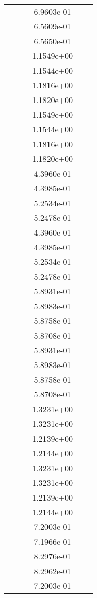 \begin{xltabular}{\textwidth}{r|rS[table-format=1.3e+2]S[table-format=1.4e+2]S[table-format=1.4e+2]S[table-format=-1.5]}
&  &  & 6.9603e-01 & & \\
&  &  & 6.5609e-01 & & \\
&  &  & 6.5650e-01 & & \\
&  &  & 1.1549e+00 & & \\
&  &  & 1.1544e+00 & & \\
&  &  & 1.1816e+00 & & \\
&  &  & 1.1820e+00 & & \\
&  &  & 1.1549e+00 & & \\
&  &  & 1.1544e+00 & & \\
&  &  & 1.1816e+00 & & \\
&  &  & 1.1820e+00 & & \\
&  &  & 4.3960e-01 & & \\
&  &  & 4.3985e-01 & & \\
&  &  & 5.2534e-01 & & \\
&  &  & 5.2478e-01 & & \\
&  &  & 4.3960e-01 & & \\
&  &  & 4.3985e-01 & & \\
&  &  & 5.2534e-01 & & \\
&  &  & 5.2478e-01 & & \\
&  &  & 5.8931e-01 & & \\
&  &  & 5.8983e-01 & & \\
&  &  & 5.8758e-01 & & \\
&  &  & 5.8708e-01 & & \\
&  &  & 5.8931e-01 & & \\
&  &  & 5.8983e-01 & & \\
&  &  & 5.8758e-01 & & \\
&  &  & 5.8708e-01 & & \\
&  &  & 1.3231e+00 & & \\
&  &  & 1.3231e+00 & & \\
&  &  & 1.2139e+00 & & \\
&  &  & 1.2144e+00 & & \\
&  &  & 1.3231e+00 & & \\
&  &  & 1.3231e+00 & & \\
&  &  & 1.2139e+00 & & \\
&  &  & 1.2144e+00 & & \\
&  &  & 7.2003e-01 & & \\
&  &  & 7.1966e-01 & & \\
&  &  & 8.2976e-01 & & \\
&  &  & 8.2962e-01 & & \\
&  &  & 7.2003e-01 & & \\

\end{xltabular}
